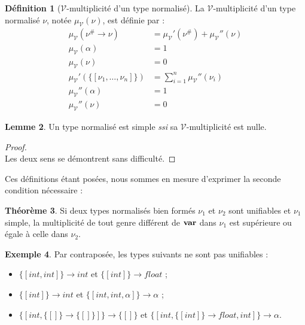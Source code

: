 \documentclass[a4paper]{report}
\newenvironment{preuve} 
  {\begin{proof}~\\} 
  {\end{proof}}
\theoremstyle{definition}
\newtheorem{theoreme}{Théorème}
\newtheorem{definition}[theoreme]{Définition}
\newtheorem{lemme}[theoreme]{Lemme}
\newtheorem{exemple}[theoreme]{Exemple}
\newcommand{\mset}[1]{\{\![#1]\!\}}
\newcommand{\ssi}{\textit{ssi}\xspace}
\newcommand{\V}{\mathscr{V}}
\begin{document}
\begin{definition}[$\V$-multiplicité d'un type normalisé]
  La $\V$-multiplicité d'un type normalisé $\nu$, notée $\mu_\V (\nu)$, est définie par :
  \begin{align*}
      \mu_\V (\nu^\# \rightarrow \nu) &=
      \mu_\V' (\nu^\#) + \mu_\V'' (\nu)
    \\
      \mu_\V (\alpha) &=
      1
    \\
      \mu_\V (\nu) &=
      0
    \\
      \mu_\V' (\mset{\nu_1, \dots, \nu_n}) &=
      \sum_{i=1}^n \mu_\V'' (\nu_i)
    \\
      \mu_\V'' (\alpha) &=
      1
    \\
      \mu_\V'' (\nu) &=
      0
  \end{align*}
\end{definition}

\begin{lemme}
  Un type normalisé est simple \ssi sa $\V$-multiplicité est nulle.
\end{lemme}

\begin{preuve}
  Les deux sens se démontrent sans difficulté.
\end{preuve}

Ces définitions étant posées, nous sommes en mesure d'exprimer la seconde condition nécessaire :

\begin{theoreme} \label{thm_cond2}
  Si deux types normalisés bien formés $\nu_1$ et $\nu_2$ sont unifiables et $\nu_1$ simple, la multiplicité de tout genre différent de $\bold{var}$ dans $\nu_1$ est supérieure ou égale à celle dans $\nu_2$.
\end{theoreme}

\begin{exemple}
  Par contraposée, les types suivants ne sont pas unifiables :
  \begin{itemize}
    \item $\mset{int, int} \rightarrow int$ et $\mset{int} \rightarrow float$ ;
    \item $\mset{int} \rightarrow int$ et $\mset{int, int, \alpha} \rightarrow \alpha$ ;
    \item $\mset{int, \mset{} \rightarrow \mset{}} \rightarrow \mset{}$ et $\mset{int, \mset{int} \rightarrow float, int} \rightarrow \alpha$.
  \end{itemize}
\end{exemple}
\end{document}
